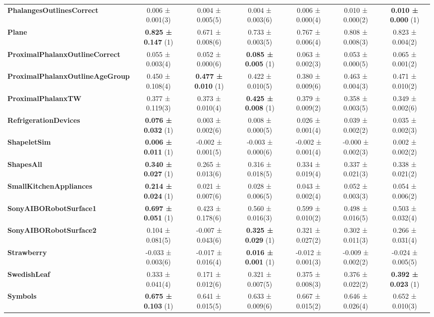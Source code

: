 \begin{table}[ht]
\begin{adjustbox}{width=\textwidth}
\begin{tabular}{lcccccc}
    \textbf{PhalangesOutlinesCorrect} & 0.006 ± 0.001(3) & 0.004 ± 0.005(5) & 0.004 ± 0.003(6) & 0.006 ± 0.000(4) & 0.010 ± 0.000(2) & \textbf{0.010 ± 0.000} (1) \\
    \textbf{Plane} & \textbf{0.825 ± 0.147} (1) & 0.671 ± 0.008(6) & 0.733 ± 0.003(5) & 0.767 ± 0.006(4) & 0.808 ± 0.008(3) & 0.823 ± 0.004(2) \\
    \textbf{ProximalPhalanxOutlineCorrect} & 0.055 ± 0.003(4) & 0.052 ± 0.000(6) & \textbf{0.085 ± 0.005} (1) & 0.063 ± 0.002(3) & 0.053 ± 0.000(5) & 0.065 ± 0.001(2) \\
    \textbf{ProximalPhalanxOutlineAgeGroup} & 0.450 ± 0.108(4) & \textbf{0.477 ± 0.010} (1) & 0.422 ± 0.010(5) & 0.380 ± 0.009(6) & 0.463 ± 0.004(3) & 0.471 ± 0.010(2) \\
    \textbf{ProximalPhalanxTW} & 0.377 ± 0.119(3) & 0.373 ± 0.010(4) & \textbf{0.425 ± 0.008} (1) & 0.379 ± 0.009(2) & 0.358 ± 0.003(5) & 0.349 ± 0.002(6) \\
    \textbf{RefrigerationDevices} & \textbf{0.076 ± 0.032} (1) & 0.003 ± 0.002(6) & 0.008 ± 0.000(5) & 0.026 ± 0.001(4) & 0.039 ± 0.002(2) & 0.035 ± 0.002(3) \\
    \textbf{ShapeletSim} & \textbf{0.006 ± 0.011} (1) & -0.002 ± 0.001(5) & -0.003 ± 0.000(6) & -0.002 ± 0.001(4) & -0.000 ± 0.002(3) & 0.002 ± 0.002(2) \\
    \textbf{ShapesAll} & \textbf{0.340 ± 0.027} (1) & 0.265 ± 0.013(6) & 0.316 ± 0.018(5) & 0.334 ± 0.019(4) & 0.337 ± 0.021(3) & 0.338 ± 0.021(2) \\
    \textbf{SmallKitchenAppliances} & \textbf{0.214 ± 0.024} (1) & 0.021 ± 0.007(6) & 0.028 ± 0.006(5) & 0.043 ± 0.002(4) & 0.052 ± 0.003(3) & 0.054 ± 0.006(2) \\
    \textbf{SonyAIBORobotSurface1} & \textbf{0.697 ± 0.051} (1) & 0.423 ± 0.178(6) & 0.560 ± 0.016(3) & 0.599 ± 0.010(2) & 0.498 ± 0.016(5) & 0.503 ± 0.032(4) \\
    \textbf{SonyAIBORobotSurface2} & 0.104 ± 0.081(5) & -0.007 ± 0.043(6) & \textbf{0.325 ± 0.029} (1) & 0.321 ± 0.027(2) & 0.302 ± 0.011(3) & 0.266 ± 0.031(4) \\
    \textbf{Strawberry} & -0.033 ± 0.003(6) & -0.017 ± 0.016(4) & \textbf{0.016 ± 0.001} (1) & -0.012 ± 0.001(3) & -0.009 ± 0.002(2) & -0.024 ± 0.005(5) \\
    \textbf{SwedishLeaf} & 0.333 ± 0.041(4) & 0.171 ± 0.012(6) & 0.321 ± 0.007(5) & 0.375 ± 0.008(3) & 0.376 ± 0.022(2) & \textbf{0.392 ± 0.023} (1) \\
    \textbf{Symbols} & \textbf{0.675 ± 0.103} (1) & 0.641 ± 0.015(5) & 0.633 ± 0.009(6) & 0.667 ± 0.015(2) & 0.646 ± 0.026(4) & 0.652 ± 0.010(3) \\

\end{tabular}
\end{adjustbox}
\end{table}
